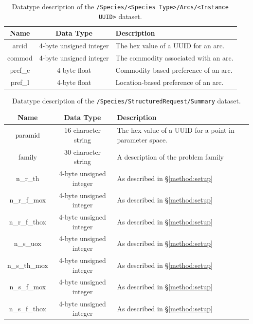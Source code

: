 \begin{table}[h!]
\centering
\caption{\label{tbl:/Species/StructuredRequest/Arcs/id_8017b48888ac424fb991527195a831b6}
Datatype description of the \lstinline[basicstyle=\ttfamily\color{black}]|/Species/<Species Type>/Arcs/<Instance UUID>| dataset.}
\begin{tabularx}{\columnwidth-10pt}{|c|c|X|} %
\hline
\textbf{Name} & \textbf{Data Type} & \textbf{Description}       \\ \hline
arcid & 4-byte unsigned integer & The hex value of a UUID for an arc. \\ \hline
commod & 4-byte unsigned integer & The commodity associated with an arc. \\ \hline
pref\_c & 4-byte float & Commodity-based preference of an arc. \\ \hline
pref\_l & 4-byte float & Location-based preference of an arc. \\ \hline
\end{tabularx}
\end{table}

\begin{table}[h!]
\centering
\label{tbl:/Species/StructuredRequest/Summary}
\caption{Datatype description of the \lstinline[basicstyle=\ttfamily\color{black}]|/Species/StructuredRequest/Summary| dataset.}
\begin{tabularx}{\columnwidth-10pt}{|c|c|X|} %
\hline
\textbf{Name} & \textbf{Data Type} & \textbf{Description}       \\ \hline
paramid & 16-character string & The hex value of a UUID for a point in parameter space. \\ \hline
family & 30-character string & A description of the problem family \\ \hline
n\_r\_th & 4-byte unsigned integer & As described in \S \ref{method:setup} \\ \hline
n\_r\_f\_mox & 4-byte unsigned integer & As described in \S \ref{method:setup} \\ \hline
n\_r\_f\_thox & 4-byte unsigned integer & As described in \S \ref{method:setup} \\ \hline
n\_s\_uox & 4-byte unsigned integer & As described in \S \ref{method:setup} \\ \hline
n\_s\_th\_mox & 4-byte unsigned integer & As described in \S \ref{method:setup} \\ \hline
n\_s\_f\_mox & 4-byte unsigned integer & As described in \S \ref{method:setup} \\ \hline
n\_s\_f\_thox & 4-byte unsigned integer & As described in \S \ref{method:setup} \\ \hline
\end{tabularx}
\end{table}

